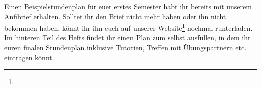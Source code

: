 Einen Beispielstundenplan für euer erstes Semester habt ihr bereits mit unserem
Anfibrief erhalten. Solltet ihr den Brief nicht mehr haben oder ihn nicht
bekommen haben, könnt ihr ihn euch auf unserer
Website\footnote{} nochmal runterladen.\\ 
Im hinteren Teil des Hefts findet ihr einen Plan zum selbst ausfüllen, in dem
ihr euren finalen Stundenplan inklusive
Tutorien, Treffen mit Übungspartnern etc. eintragen könnt.
